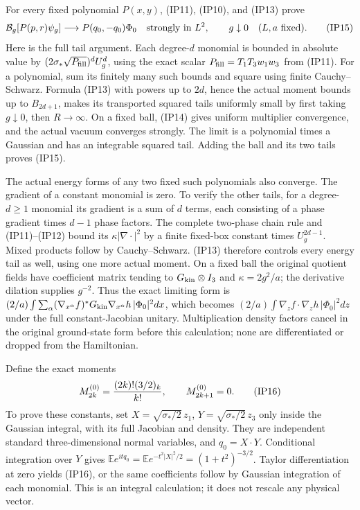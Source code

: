\documentclass[11pt]{article}
\begin{document}
For every fixed polynomial \(P(x,y)\), (IP11), (IP10), and (IP13)
prove
\[
 \mathcal B_g[P(p,r)\psi_g]
       \longrightarrow P(q_0,-q_0)\Phi_0
       \quad\hbox{strongly in }L^2,\qquad g\downarrow0
       \quad(L,a\hbox{ fixed}).\tag{IP15}
\]
Here is the full tail argument. Each degree-\(d\) monomial is bounded
in absolute value by \((2\sigma_*\sqrt{P_{\rm fill}})^d U_g^d\),
using the exact scalar \(P_{\rm fill}=T_1T_3w_1w_3\) from (IP11).
For a polynomial, sum its finitely many such bounds and square using
finite Cauchy–Schwarz. Formula (IP13) with powers up to \(2d\), hence
the actual moment bounds up to \(B_{2d+1}\), makes its transported
squared tails uniformly small by first taking \(g\downarrow0\),
then \(R\to\infty\). On a fixed ball, (IP14) gives uniform multiplier
convergence, and the actual vacuum converges strongly. The limit is a
polynomial times a Gaussian and has an integrable squared tail. Adding
the ball and its two tails proves (IP15).

The actual energy forms of any two fixed such polynomials also converge.
The gradient of a constant monomial is zero. To verify the other tails,
for a degree-\(d\ge1\) monomial its gradient is a sum
of \(d\) terms, each consisting of a phase gradient times \(d-1\)
phase factors. The complete two-phase chain rule and (IP11)–(IP12)
bound its \(\kappa|\nabla\cdot|^2\) by a finite fixed-box constant
times \(U_g^{2d-1}\). Mixed products follow by Cauchy–Schwarz. (IP13)
therefore controls every energy tail as well, using one more actual
moment. On a fixed ball the original quotient fields have coefficient
matrix tending to \(G_{\rm kin}\otimes I_3\) and
\(\kappa=2g^2/a\); the derivative dilation supplies \(g^{-2}\).
Thus the exact limiting form is
\((2/a)\int\sum_\alpha(\nabla_{x^\alpha}f)^*
G_{\rm kin}\nabla_{x^\alpha}h\,|\Phi_0|^2dx\), which becomes
\((2/a)\int\nabla_zf\cdot\nabla_zh\,|\Phi_0|^2dz\)
under the full constant-Jacobian unitary. Multiplication density factors
cancel in the original ground-state form before this calculation;
none are differentiated or dropped from the Hamiltonian.

Define the exact moments
\[
 M_{2k}^{(0)}={(2k)!(3/2)_k\over k!},\qquad M_{2k+1}^{(0)}=0.
 \tag{IP16}
\]
To prove these constants, set
\(X=\sqrt{\sigma_*/2}\,z_1\), \(Y=\sqrt{\sigma_*/2}\,z_3\)
only inside the Gaussian integral, with its full Jacobian and density.
They are independent standard three-dimensional normal variables, and
\(q_0=X\cdot Y\). Conditional integration over \(Y\) gives
\(\mathbb E e^{itq_0}=\mathbb E e^{-t^2|X|^2/2}
=(1+t^2)^{-3/2}\). Taylor differentiation at zero yields (IP16),
or the same coefficients follow by Gaussian integration of each monomial.
This is an integral calculation; it does not rescale any physical vector.
\end{document}
